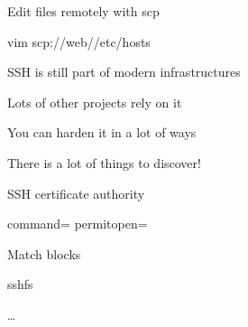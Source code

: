 \begin{iframe}[vim]
\item Edit files remotely with scp
\item vim scp://web//etc/hosts
\end{iframe}

\begin{iframe}[Conclusion]
    \item SSH is still part of modern infrastructures
    \item Lots of other projects rely on it
    \item You can harden it in a lot of ways
    \item There is a lot of things to discover!
    \end{iframe}

    \begin{iframe}[Homework]
    \item SSH certificate authority
    \item command= permitopen=
    \item Match blocks
    \item sshfs
    \item \dots
    \end{iframe}











\contactSlide


